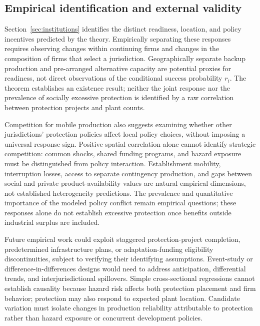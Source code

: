 \subsection{Empirical identification and external validity}\label{sec:empirical-implications}

Section~\ref{sec:institutions} identifies the distinct readiness, location, and policy incentives predicted by the theory. Empirically separating these responses requires observing changes within continuing firms and changes in the composition of firms that select a jurisdiction. Geographically separate backup production and pre-arranged alternative capacity are potential proxies for readiness, not direct observations of the conditional success probability $r_i$. The theorem establishes an existence result; neither the joint response nor the prevalence of socially excessive protection is identified by a raw correlation between protection projects and plant counts.

Competition for mobile production also suggests examining whether other jurisdictions' protection policies affect local policy choices, without imposing a universal response sign. Positive spatial correlation alone cannot identify strategic competition: common shocks, shared funding programs, and hazard exposure must be distinguished from policy interaction. Establishment mobility, interruption losses, access to separate contingency production, and gaps between social and private product-availability values are natural empirical dimensions, not established heterogeneity predictions. The prevalence and quantitative importance of the modeled policy conflict remain empirical questions; these responses alone do not establish excessive protection once benefits outside industrial surplus are included.

Future empirical work could exploit staggered protection-project completion, predetermined infrastructure plans, or adaptation-funding eligibility discontinuities, subject to verifying their identifying assumptions. Event-study or difference-in-differences designs would need to address anticipation, differential trends, and interjurisdictional spillovers. Simple cross-sectional regressions cannot establish causality because hazard risk affects both protection placement and firm behavior; protection may also respond to expected plant location. Candidate variation must isolate changes in production reliability attributable to protection rather than hazard exposure or concurrent development policies.

